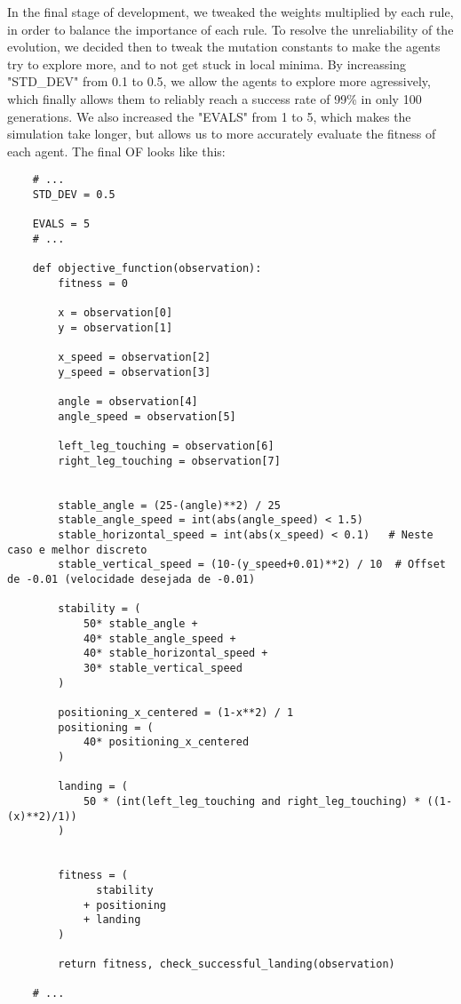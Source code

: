 \documentclass{article}
\begin{document}
In the final stage of development, we tweaked the weights multiplied by each rule, in order to balance the importance of each rule.
To resolve the unreliability of the evolution, we decided then to tweak the mutation constants to make the agents try to explore more, and to not get stuck in local minima.
By increassing "STD\_DEV" from 0.1 to 0.5, we allow the agents to explore more agressively, which finally allows them to reliably reach a success rate of 99\% in only 100 generations.
We also increased the "EVALS" from 1 to 5, which makes the simulation take longer, but allows us to more accurately evaluate the fitness of each agent.
The final OF looks like this:
\begin{lstlisting}
    # ...
    STD_DEV = 0.5

    EVALS = 5
    # ...

    def objective_function(observation):
        fitness = 0

        x = observation[0]
        y = observation[1]

        x_speed = observation[2]
        y_speed = observation[3]

        angle = observation[4]
        angle_speed = observation[5]

        left_leg_touching = observation[6]
        right_leg_touching = observation[7]


        stable_angle = (25-(angle)**2) / 25
        stable_angle_speed = int(abs(angle_speed) < 1.5)
        stable_horizontal_speed = int(abs(x_speed) < 0.1)   # Neste caso e melhor discreto
        stable_vertical_speed = (10-(y_speed+0.01)**2) / 10  # Offset de -0.01 (velocidade desejada de -0.01)

        stability = (
            50* stable_angle +
            40* stable_angle_speed +
            40* stable_horizontal_speed +
            30* stable_vertical_speed
        )

        positioning_x_centered = (1-x**2) / 1
        positioning = (
            40* positioning_x_centered
        )

        landing = (
            50 * (int(left_leg_touching and right_leg_touching) * ((1-(x)**2)/1))
        )


        fitness = (
              stability
            + positioning
            + landing
        )

        return fitness, check_successful_landing(observation)

    # ...
\end{lstlisting}
\end{document}

